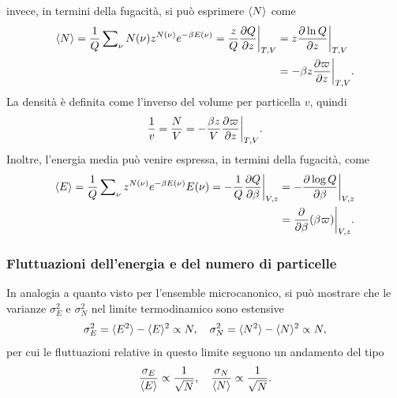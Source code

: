 invece, in termini della fugacità, si può esprimere $\langle N \rangle$ come
\begin{equation}
\label{eq: numero medio N (grancanonico)}
    \begin{split}
        \langle N \rangle = \frac{1}{Q}\sum\nolimits_\nu N(\nu)z^{N(\nu)}e^{-\beta E(\nu)} = \frac{z}{Q}\frac{\partial Q}{\partial z}\bigg|_{T,V} 
        &= z\frac{\partial\ln{Q}}{\partial z}\bigg|_{T,V} \\ 
        &= -\beta z\frac{\partial\varpi}{\partial z}\bigg|_{T,V}.
    \end{split}
\end{equation}
La densità è definita come l'inverso del volume per particella $v$, quindi 
\begin{equation}
    \frac{1}{v} = \frac{N}{V} = -\frac{\beta z}{V}\frac{\partial\varpi}{\partial z}\bigg|_{T,V}.
\end{equation}
Inoltre, l'energia media può venire espressa, in termini della fugacità, come
\begin{equation}
\label{eq: numero medio E (grancanonico)}
    \begin{split}
        \langle E \rangle = \frac{1}{Q}\sum\nolimits_\nu z^{N(\nu)}e^{-\beta E(\nu)}E(\nu) = -\frac{1}{Q}\frac{\partial Q}{\partial\beta}\bigg|_{V,z} &= -\frac{\partial\log{Q}}{\partial\beta}\bigg|_{V,z} \\
        &= \frac{\partial}{\partial\beta}(\beta\varpi)\bigg|_{V,z}.
    \end{split}
\end{equation}

\subsubsection{Fluttuazioni dell'energia e del numero di particelle}
In analogia a quanto visto per l'ensemble microcanonico, si può mostrare che le varianze $\sigma^2_E$ e $\sigma_N^2$ nel limite termodinamico sono estensive
\begin{equation}
    \sigma_E^2 = \langle E^2 \rangle - \langle E \rangle^2 \propto N,\quad \sigma_N^2 = \langle N^2 \rangle - \langle N \rangle^2 \propto N,
\end{equation}
per cui le fluttuazioni relative in questo limite seguono un  andamento del tipo
\begin{equation}
    \frac{\sigma_E}{\langle E \rangle} \propto \frac{1}{\sqrt{N}}, \quad \frac{\sigma_N}{\langle N \rangle} \propto \frac{1}{\sqrt{N}}.
\end{equation}

